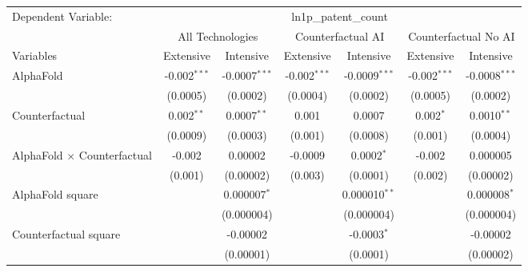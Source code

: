 \begingroup
\centering
\begin{tabular}{lcccccc}
   \tabularnewline \midrule \midrule
   Dependent Variable: & \multicolumn{6}{c}{ln1p\_patent\_count}\\
 & \multicolumn{2}{c}{All Technologies} & \multicolumn{2}{c}{Counterfactual AI} & \multicolumn{2}{c}{Counterfactual No AI} \\
\cmidrule(lr){1-1}\cmidrule(lr){2-3} \cmidrule(lr){4-5} \cmidrule(lr){6-7}
Variables & \multicolumn{1}{c}{Extensive} & \multicolumn{1}{c}{Intensive} & \multicolumn{1}{c}{Extensive} & \multicolumn{1}{c}{Intensive} & \multicolumn{1}{c}{Extensive} & \multicolumn{1}{c}{Intensive} \\
\cmidrule(lr){1-1}\cmidrule(lr){2-2} \cmidrule(lr){3-3} \cmidrule(lr){4-4} \cmidrule(lr){5-5} \cmidrule(lr){6-6} \cmidrule(lr){7-7}
   AlphaFold                          & -0.002$^{***}$ & -0.0007$^{***}$ & -0.002$^{***}$ & -0.0009$^{***}$ & -0.002$^{***}$ & -0.0008$^{***}$\\   
                                      & (0.0005)       & (0.0002)        & (0.0004)       & (0.0002)        & (0.0005)       & (0.0002)\\   
   Counterfactual                     & 0.002$^{**}$   & 0.0007$^{**}$   & 0.001          & 0.0007          & 0.002$^{*}$    & 0.0010$^{**}$\\   
                                      & (0.0009)       & (0.0003)        & (0.001)        & (0.0008)        & (0.001)        & (0.0004)\\   
   AlphaFold $\times$ Counterfactual  & -0.002         & 0.00002         & -0.0009        & 0.0002$^{*}$    & -0.002         & 0.000005\\   
                                      & (0.001)        & (0.00002)       & (0.003)        & (0.0001)        & (0.002)        & (0.00002)\\   
   AlphaFold square                   &                & 0.000007$^{*}$  &                & 0.000010$^{**}$ &                & 0.000008$^{*}$\\   
                                      &                & (0.000004)      &                & (0.000004)      &                & (0.000004)\\   
   Counterfactual square              &                & -0.00002        &                & -0.0003$^{*}$   &                & -0.00002\\   
                                      &                & (0.00001)       &                & (0.0001)        &                & (0.00002)\\   

\end{tabular}
